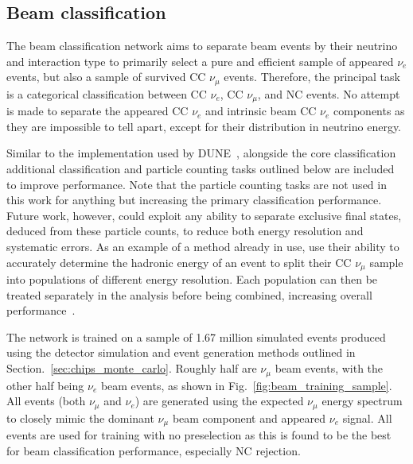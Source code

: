 \subsection{Beam classification}%
\label{sec:cnn_specific_beam} %

The beam classification network aims to separate beam events by their neutrino and interaction
type to primarily select a pure and efficient sample of appeared $\nu_{e}$ events, but also a
sample of survived CC $\nu_{\mu}$ events. Therefore, the principal task is a categorical
classification between CC $\nu_{e}$, CC $\nu_{\mu}$, and NC events. No attempt is made to separate
the appeared CC $\nu_{e}$ and intrinsic beam CC $\nu_{e}$ components as they are impossible to
tell apart, except for their distribution in neutrino energy.

Similar to the implementation used by DUNE~\cite{collaboration2020}, alongside the core
classification additional classification and particle counting tasks outlined below are included
to improve performance. Note that the particle counting tasks are not used in this work for
anything but increasing the primary classification performance. Future work, however, could
exploit any ability to separate exclusive final states, deduced from these particle counts, to
reduce both energy resolution and systematic errors. As an example of a method already in use,
\nova use their ability to accurately determine the hadronic energy of an event to split their CC
$\nu_{\mu}$ sample into populations of different energy resolution. Each population can then be
treated separately in the analysis before being combined, increasing overall
performance~\cite{acero2018}.

The network is trained on a sample of 1.67 million simulated events produced using the detector
simulation and event generation methods outlined in Section.~\ref{sec:chips_monte_carlo}. Roughly
half are $\nu_{\mu}$ beam events, with the other half being $\nu_{e}$ beam events, as shown in
Fig.~\ref{fig:beam_training_sample}. All events (both $\nu_{\mu}$ and $\nu_{e}$) are generated
using the expected \chipsfive $\nu_{\mu}$ energy spectrum to closely mimic the dominant
$\nu_{\mu}$ beam component and appeared $\nu_{e}$ signal. All events are used for training with no
preselection as this is found to be the best for beam classification performance, especially NC
rejection.


